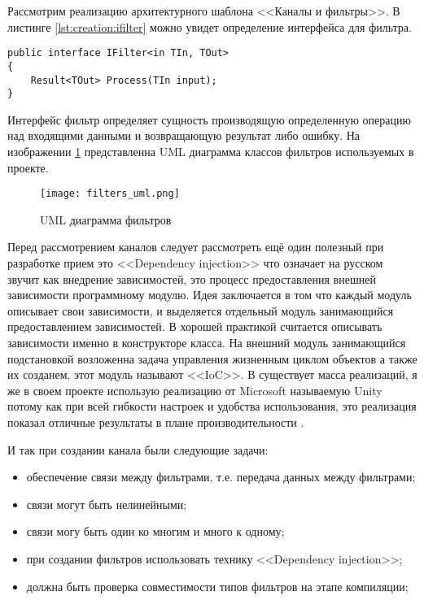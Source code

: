 Рассмотрим реализацию архитектурного шаблона <<Каналы и фильтры>>. В листинге \ref{lst:creation:ifilter} можно увидет определение интерфейса для фильтра. 
\begin{lstlisting}[style=fsharpstyle, caption={Определение интерфейса для фильтра}, label=lst:creation:ifilter]
public interface IFilter<in TIn, TOut> 
{
	Result<TOut> Process(TIn input);
}
\end{lstlisting}
Интерфейс фильтр определяет сущность производящую определенную операцию над входящими данными и возвращающую результат либо ошибку. На изображении \ref{fig:creation:filters_uml} представленна UML диаграмма классов фильтров используемых в проекте.
\begin{figure}[ht] 
    \centering
    \texttt{[image: filters\_uml.png]}  
    \caption{UML диаграмма фильтров}
    \label{fig:creation:filters_uml}
\end{figure}

Перед рассмотрением каналов следует рассмотреть ещё один полезный при разработке прием это <<Dependency injection>> что означает на русском звучит как внедрение зависимостей, это процесс предоставления внешней зависимости программному модулю. Идея заключается в том что каждый модуль описывает свои зависимости, и выделяется отдельный модуль занимающийся предоставлением зависимостей. В \csharp{} хорошей практикой считается описывать зависимости именно в конструкторе класса. На внешний модуль занимающийся подстановкой возложенна задача управления жизненным циклом объектов а также их созданем, этот модуль называют <<IoC>>. В \dotnet{} существует масса реализаций, я же в своем проекте использую реализацию от Microsoft называемую Unity потому как при всей гибкости настроек и удобства использования, это реализация показал отличные результаты в плане производительности \cite{ioc_perfomance}.

И так при создании канала были следующие задачи:
\begin{itemize}
  \item обеспечение связи между фильтрами, т.е. передача данных между фильтрами;
  \item связи могут быть нелинейными;
  \item связи могу быть один ко многим и много к одному;
  \item при создании фильтров использовать технику <<Dependency injection>>;
  \item должна быть проверка совместимости типов фильтров на этапе компиляции;
\end{itemize}

